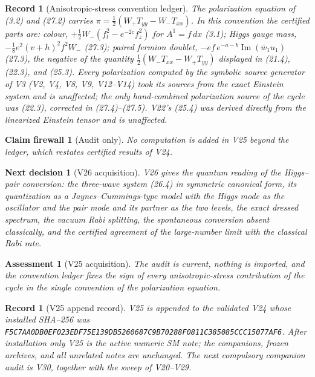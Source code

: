\documentclass[11pt]{article}
\newtheorem{firewall}[theorem]{Claim firewall}
\newtheorem{decision}[theorem]{Next decision}
\newtheorem{assessment}[theorem]{Assessment}
\newtheorem{record}[theorem]{Record}
\theoremstyle{remark}
\begin{document}
\begin{record}[Anisotropic-stress convention ledger]
\label{rec:v20v25-conventions}
The polarization equation of (3.2) and (27.2) carries
\(\pi=\tfrac12(W_+T_{yy}-W_-T_{xx})\).  In this convention the
certified parts are: colour, \(+\tfrac12W_-(f_t^2-e^{-2c}f_z^2)\)
for \(A^1=f\,dx\) (3.1); Higgs gauge mass,
\(-\tfrac18e^2(v+h)^2f^2W_-\) (27.3); paired fermion doublet,
\(-ef\,e^{-a-b}\operatorname{Im}(\bar w_1u_1)\) (27.3), the negative of
the quantity \(\tfrac12(W_-T_{xx}-W_+T_{yy})\) displayed in (21.4),
(22.3), and (25.3).  Every polarization computed by the symbolic
source generator of V3 (V2, V4, V8, V9, V12--V14) took its sources
from the exact Einstein system and is unaffected; the only
hand-combined polarization source of the cycle was (22.3), corrected
in (27.4)--(27.5).  V22's (25.4) was derived directly from the
linearized Einstein tensor and is unaffected.
\end{record}

\begin{firewall}[Audit only]
\label{fire:v20v25}
No computation is added in V25 beyond the ledger, which restates
certified results of V24.
\end{firewall}

\begin{decision}[V26 acquisition]
\label{dec:v20v25-next}
V26 gives the quantum reading of the Higgs--pair conversion: the
three-wave system (26.4) in symmetric canonical form, its
quantization as a Jaynes--Cummings-type model with the Higgs mode as
the oscillator and the pair mode and its partner as the two levels,
the exact dressed spectrum, the vacuum Rabi splitting, the
spontaneous conversion absent classically, and the certified
agreement of the large-number limit with the classical Rabi rate.
\end{decision}

\begin{assessment}[V25 acquisition]
\label{ass:v20v25}
The audit is current, nothing is imported, and the convention ledger
fixes the sign of every anisotropic-stress contribution of the cycle
in the single convention of the polarization equation.
\end{assessment}

\begin{record}[V25 append record]
\label{rec:v20v25}
V25 is appended to the validated V24 whose installed SHA--256 was
\texttt{F5C7AA0DB0EF023EDF75E139DB5260687C9B70288F0811C385085CCC15077AF6}.
After installation only V25 is the active numeric SM note; the
companions, frozen archives, and all unrelated notes are unchanged.
The next compulsory companion audit is V30, together with the sweep
of V20--V29.
\end{record}
\end{document}
